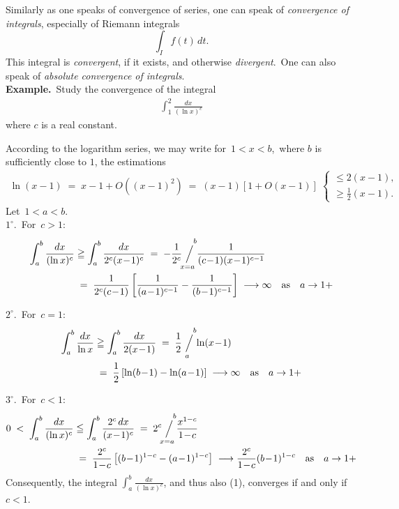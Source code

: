 \documentclass[12pt]{article}
\newcommand{\sijoitus}[2]%
{\operatornamewithlimits{\Big/}_{\!\!\!#1}^{\,#2}}
\begin{document}
 

Similarly as one speaks of convergence of series, one can speak of \emph{convergence of integrals}, especially of Riemann integrals
$$\int_If(t)\,dt.$$
This integral is \emph{convergent}, if it exists, and otherwise \emph{divergent}.\, One can also speak of \emph{absolute convergence of integrals}.\\

\textbf{Example.}\, Study the convergence of the integral
\begin{align}
\int_1^2\frac{dx}{(\ln{x})^c}
\end{align}
where $c$ is a real constant.

According to the logarithm series, we may write for\, $1 < x < b$,\, where $b$ is sufficiently close to $1$, the estimations
\begin{align*}
\ln(x\!-\!1) \;=\; x-1+O((x\!-\!1)^2) \;=\; (x\!-\!1)[1+O(x\!-\!1)] \;
\begin{cases}
\leq 2(x\!-\!1), \\
\geq \frac{1}{2}(x\!-\!1). 
\end{cases}
\end{align*}
Let\, $1 < a < b$.\, \\

$1^\circ$.\, For\, $c > 1$:
\begin{align*}
\int_a^b\frac{dx}{(\ln{x})^c} &\geqq \int_a^b\frac{dx}{2^c(x\!-\!1)^c}
   \;=\; -\frac{1}{2^c}\!\sijoitus{x=a}{\quad b}\!\frac{1}{(c\!-\!1)(x\!-\!1)^{c-1}}\\
  &\;=\; \frac{1}{2^c(c\!-\!1)}\left[\frac{1}{(a\!-\!1)^{c-1}}-\frac{1}{(b\!-\!1)^{c-1}}\right]
\;\longrightarrow \infty \quad \mbox{as} \quad a \to 1+
\end{align*}

$2^\circ$.\, For\, $c = 1$:
\begin{align*}
\int_a^b\frac{dx}{\ln{x}} &\geqq \int_a^b\frac{dx}{2(x\!-\!1)}
   \;=\; \frac{1}{2}\!\sijoitus{a}{\quad b}\!\ln(x\!-\!1)\\
  &\;=\; \frac{1}{2}\left[\ln(b\!-\!1)-\ln(a\!-\!1)\right]
\;\longrightarrow \infty \quad \mbox{as} \quad a \to 1+
\end{align*}

$3^\circ$.\, For\, $c < 1$:
\begin{align*}
0 \;<\; \int_a^b\frac{dx}{(\ln{x})^c} &\leqq \int_a^b\frac{2^c\,dx}{(x\!-\!1)^c}
   \;=\; 2^c\!\sijoitus{x=a}{\quad b}\!\frac{x^{1-c}}{1\!-\!c}\\
  &\;=\; \frac{2^c}{1\!-\!c}\left[(b\!-\!1)^{1-c}-(a\!-\!1)^{1-c}\right]
\;\longrightarrow \frac{2^c}{1\!-\!c}(b\!-\!1)^{1-c} \quad \mbox{as} \quad a \to 1+
\end{align*}
Consequently, the integral $\int_a^b\frac{dx}{(\ln{x})^c}$, and thus also (1), converges if and only if\, $c < 1$.


\end{document}
